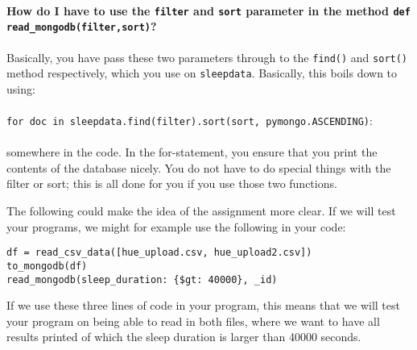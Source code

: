 \documentclass[a4paper]{report}
\theoremstyle{definition}
\newcommand{\singlequote}{\char13}
\begin{document}
\paragraph{How do I have to use the \texttt{filter} and \texttt{sort} parameter in the method \texttt{def read\_mongodb(filter,sort)}?}
Basically, you have pass these two parameters through to the \texttt{find()} and \texttt{sort()} method respectively, which you use on \texttt{sleepdata}. Basically, this boils down to using:\\\\
\texttt{for doc in sleepdata.find(filter).sort(sort, pymongo.ASCENDING)}:\\\\
somewhere in the code. In the for-statement, you ensure that you print the contents of the database nicely. You do not have to do special things with the filter or sort; this is all done for you if you use those two functions.

The following could make the idea of the assignment more clear. If we will test your programs, we might for example use the following in your code:

\texttt{df = read\_csv\_data([\singlequote{}hue\_upload.csv\singlequote{}, \singlequote{}hue\_upload2.csv\singlequote{}])}\\
\texttt{to\_mongodb(df)}\\
\texttt{read\_mongodb({\singlequote{}sleep\_duration\singlequote{}: \{\singlequote{}\$gt\singlequote{}: 40000\}}, \singlequote{}\_id\singlequote{})}

If we use these three lines of code in your program, this means that we will test your program on being able to read in both files, where we want to have all results printed of which the sleep duration is larger than 40000 seconds.
\end{document}

